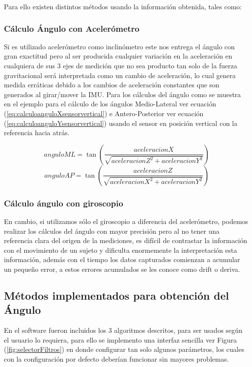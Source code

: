 \documentclass[12pt,a4paper]{article}
\begin{document}
Para ello existen distintos métodos usando la información obtenida, tales como:


\subsubsection{Cálculo Ángulo con Acelerómetro} Si es utilizado acelerómetro como inclinómetro este nos entrega el ángulo con gran exactitud pero al ser producida cualquier variación en la aceleración en cualquiera de sus 3 ejes de medición que no sea producto tan solo de la fuerza gravitacional será interpretada como un cambio de aceleración, lo cual genera medida erráticas debido a los cambios de aceleración constantes que son generados al girar/mover la IMU.
Para los cálculos del ángulo como se muestra en el ejemplo para el cálculo de los ángulos Medio-Lateral ver ecuación (\ref{eq:calculoanguloXsensorvertical}) e Antero-Posterior ver ecuación (\ref{eq:calculoanguloYsensorvertical}) usando el sensor en posición vertical con la referencia hacia atrás.

\begin{figure}[H]
	\begin{equation}
	anguloML = \tan{\left(\frac{aceleracionX}{\sqrt{aceleracionZ^{2}+aceleracionY^{2}}}\right)}
	\label{eq:calculoanguloXsensorvertical}
	\end{equation}
	\begin{equation}
	anguloAP = \tan{\left(\frac{aceleracionZ}{\sqrt{aceleracionX^{2}+aceleracionY^{2}}}\right)}
	\label{eq:calculoanguloYsensorvertical}
	\end{equation}
\end{figure}

\subsubsection{Cálculo ángulo con giroscopio} 
En cambio, si utilizamos sólo el giroscopio a diferencia del acelerómetro, podemos realizar los cálculos del ángulo con mayor precisión pero al no tener una referencia clara del origen de la mediciones, es difícil de contrastar la información con el movimiento de un sujeto y dificulta enormemente la  interpretación esta información, además con el tiempo los datos capturados comienzan a acumular un pequeño error, a estos errores acumulados se les conoce como drift o deriva.

\newpage
\subsection{Métodos implementados para obtención del Ángulo}
En el software fueron incluidos los 3 algoritmos descritos, para ser usados según el usuario lo requiera, para ello se implemento una interfaz sencilla ver Figura (\ref{fig:selectorFiltros}) en donde configurar tan solo algunos parámetros, los cuales con la configuración por defecto deberían funcionar sin mayores problemas.
\end{document}
